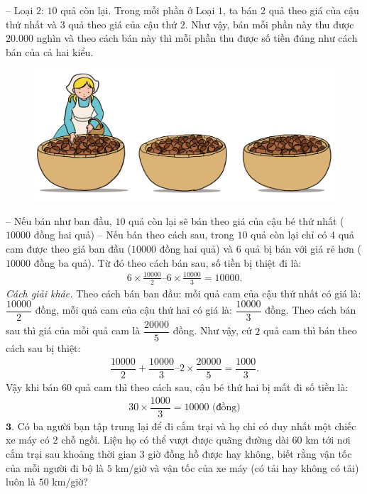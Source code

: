 \begin{multicols}{2}
	\vskip 0.1cm
	-- Loại $2$: $10$ quả còn lại.
	\vskip 0.1cm
	Trong mỗi phần ở Loại $1$, ta bán $2$ quả theo giá của cậu thứ nhất và $3$ quả theo giá của cậu thứ $2$. Như vậy, bán mỗi phần này  thu được $20{.}000$ nghìn và theo cách bán này thì mỗi phần thu được số tiền đúng như cách bán của cả hai kiểu.
	\begin{figure}[H]
		\centering
		\vspace*{-10pt}
		\captionsetup{labelformat= empty, justification=centering}
		\includegraphics[width=0.7\linewidth]{Pi10_ToanBi_Bai2}
		\vspace*{-10pt}
	\end{figure}
	-- Nếu bán như ban đầu, $10$ quả còn lại sẽ bán theo giá của cậu bé thứ nhất ($10000$ đồng hai quả)
	\vskip 0.1cm
	-- Nếu bán theo cách sau, trong $10$ quả còn lại chỉ có $4$ quả cam được theo giá ban đầu ($10000$ đồng hai quả) và $6$ quả bị bán với giá rẻ hơn ($10000$ đồng ba quả).
	\vskip 0.1cm
	Từ đó theo cách bán sau, số tiền bị thiệt đi là:
	\setlength{\abovedisplayskip}{5pt}
	\setlength{\belowdisplayskip}{5pt}
	\begin{align*}
		6\times\frac{10000}{2} – 6\times\frac{10000}{3} = 10000.
	\end{align*}
	\textit{Cách giải khác.}
	\vskip 0.1cm
	Theo cách bán ban đầu: mỗi quả cam của cậu thứ nhất có giá là: $\dfrac{10000}{2}$ đồng, mỗi quả cam của cậu thứ hai có giá là: $\dfrac{10000}{3}$ đồng.
	\vskip 0.1cm
	Theo cách bán sau thì giá của mỗi quả cam là $\dfrac{20000}{5}$ đồng.
	\vskip 0.1cm
	Như vậy, cứ $2$ quả cam thì bán theo cách sau bị thiệt:
	\begin{align*}
		\dfrac{10000}{2} + \dfrac{10000}{3} – 2\times\dfrac{20000}{5} = \dfrac{1000}{3}.
	\end{align*}
	Vậy khi bán $60$ quả cam thì theo cách sau, cậu bé thứ hai bị mất đi số tiền là:
	\begin{align*}
		30\times \dfrac{1000}{3} = 10000 \text{ (đồng)}
	\end{align*}
	$\pmb{3.}$ Có ba người bạn tập trung lại để đi cắm trại và họ chỉ có duy nhất một chiếc xe máy có $2$ chỗ ngồi. Liệu họ có thể vượt được quãng đường dài $60$ km tới nơi cắm trại sau khoảng thời gian $3$ giờ đồng hồ được hay không, biết rằng vận tốc của mỗi người đi bộ là $5$ km/giờ và vận tốc của xe máy (có tải hay không có tải) luôn là $50$ km/giờ?

\end{multicols}
